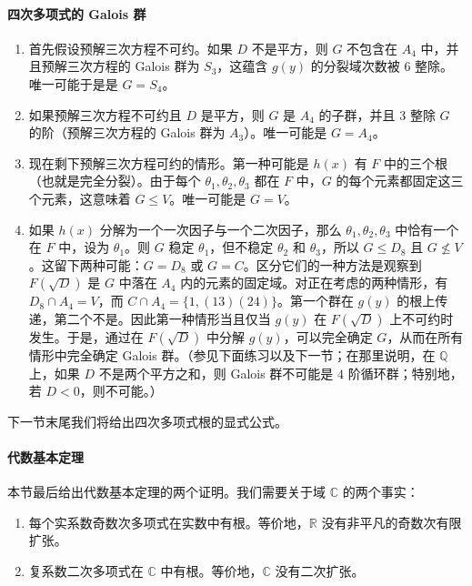 \paragraph{四次多项式的 Galois 群}
\begin{enumerate}[label=\alph*.]
\item 首先假设预解三次方程不可约。如果 $D$ 不是平方，则 $G$ 不包含在 $A_4$ 中，并且预解三次方程的 Galois 群为 $S_3$，这蕴含 $g(y)$ 的分裂域次数被 $6$ 整除。唯一可能于是是 $G=S_4$。

\item 如果预解三次方程不可约且 $D$ 是平方，则 $G$ 是 $A_4$ 的子群，并且 $3$ 整除 $G$ 的阶（预解三次方程的 Galois 群为 $A_3$）。唯一可能是 $G=A_4$。

\item[\textup{c1}.] 现在剩下预解三次方程可约的情形。第一种可能是 $h(x)$ 有 $F$ 中的三个根（也就是完全分裂）。由于每个 $\theta_1,\theta_2,\theta_3$ 都在 $F$ 中，$G$ 的每个元素都固定这三个元素，这意味着 $G\leq V$。唯一可能是 $G=V$。

\item[\textup{c2}.] 如果 $h(x)$ 分解为一个一次因子与一个二次因子，那么 $\theta_1,\theta_2,\theta_3$ 中恰有一个在 $F$ 中，设为 $\theta_1$。则 $G$ 稳定 $\theta_1$，但不稳定 $\theta_2$ 和 $\theta_3$，所以 $G\leq D_8$ 且 $G\nleq V$。这留下两种可能：$G=D_8$ 或 $G=C$。区分它们的一种方法是观察到 $F(\sqrt D)$ 是 $G$ 中落在 $A_4$ 内的元素的固定域。对正在考虑的两种情形，有 $D_8\cap A_4=V$，而 $C\cap A_4=\{1,(13)(24)\}$。第一个群在 $g(y)$ 的根上传递，第二个不是。因此第一种情形当且仅当 $g(y)$ 在 $F(\sqrt D)$ 上不可约时发生。于是，通过在 $F(\sqrt D)$ 中分解 $g(y)$，可以完全确定 $G$，从而在所有情形中完全确定 Galois 群。（参见下面练习以及下一节；在那里说明，在 $\mathbb Q$ 上，如果 $D$ 不是两个平方之和，则 Galois 群不可能是 $4$ 阶循环群；特别地，若 $D<0$，则不可能。）
\end{enumerate}

下一节末尾我们将给出四次多项式根的显式公式。

\paragraph{代数基本定理}
本节最后给出代数基本定理的两个证明。我们需要关于域 $\mathbb C$ 的两个事实：
\begin{enumerate}[label=(\alph*)]
\item 每个实系数奇数次多项式在实数中有根。等价地，$\mathbb R$ 没有非平凡的奇数次有限扩张。
\item 复系数二次多项式在 $\mathbb C$ 中有根。等价地，$\mathbb C$ 没有二次扩张。
\end{enumerate}


